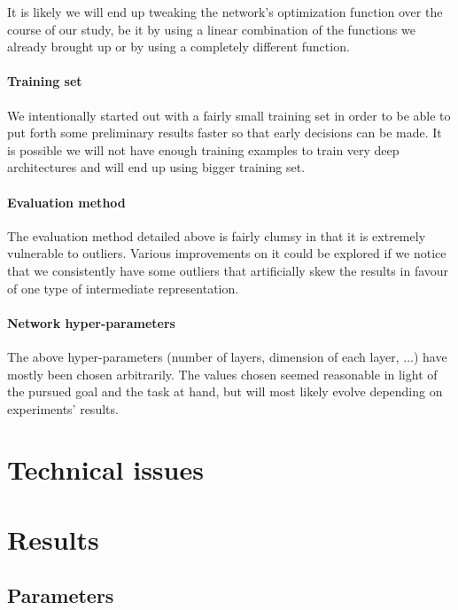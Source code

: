 \documentclass[conference]{IEEEtran}
\begin{document}
It is likely we will end up tweaking the network's optimization function over the course
of our study, be it by using a linear combination of the functions we already
brought up or by using a completely different function.

\paragraph{Training set}

We intentionally started out with a fairly small training set in order to be
able to put forth some preliminary results faster so that early decisions can be
made. It is possible we will not have enough training examples to train very
deep architectures and will end up using bigger training set.

\paragraph{Evaluation method}

The evaluation method detailed above is fairly clumsy in that it is extremely
vulnerable to outliers. Various improvements on it could be explored if we
notice that we consistently have some outliers that artificially skew the
results in favour of one type of intermediate representation.

\paragraph{Network hyper-parameters}

The above hyper-parameters (number of layers, dimension of each layer, ...) have
mostly been chosen arbitrarily. The values chosen seemed reasonable in light of
the pursued goal and the task at hand, but will most likely evolve depending on
experiments' results.


\section{Technical issues}

\section{Results}

\subsection{Parameters}
\end{document}
